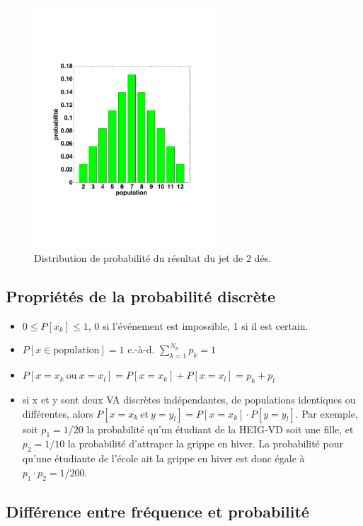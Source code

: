 \documentclass[main.tex]{subfiles}
\begin{document}
\begin{figure}[h]
    \centering
    \includegraphics[width=7cm]{assets/figures/Serie2_exe01fig1.pdf}
    \caption{Distribution de probabilité du résultat du jet de 2 dés.}
    \label{fig:ddjddd}
\end{figure}

\subsection{Propriétés de la probabilité discrète}

\begin{itemize}
    \item $0\le P[x_k]\le 1$, 0 si l'événement est impossible, 1 si il est certain.
    \item $P[x\in\text{population}]=1$ c.-à-d. $\sum_{k=1}^{N_p} p_k=1$
    \item $P[x=x_k\ \text{ou}\ x=x_l]=P[x=x_k]+P[x=x_l]=p_k+p_l$
    \item si x et y sont deux VA discrètes indépendantes, de populations identiques ou différentes, alors $P[x=x_k\ \text{et}\ y=y_l]=P[x=x_k]\cdot P[y=y_l]$. Par exemple, soit $p_1=1/20$ la probabilité qu'un étudiant de la HEIG-VD soit une fille, et $p_2=1/10$ la probabilité d'attraper la grippe en hiver. La probabilité pour qu'une étudiante de l'école ait la grippe en hiver est donc égale à $p_1\cdot p_2=1/200$.
\end{itemize}

\subsection{Différence entre fréquence et probabilité}
\end{document}
